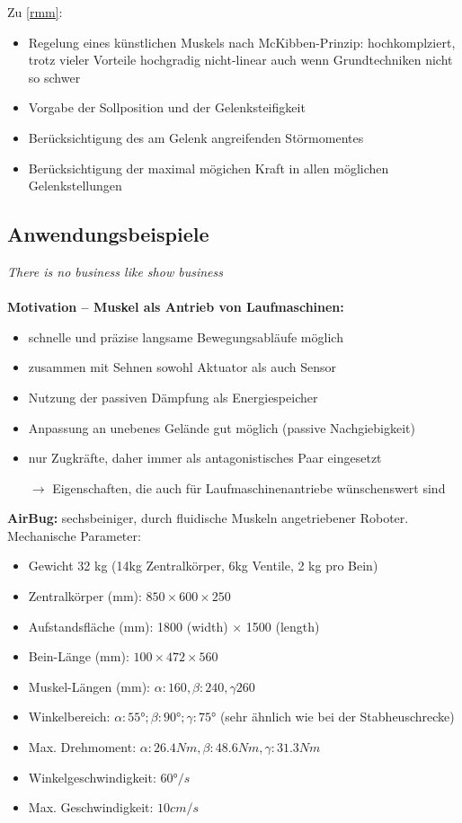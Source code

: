 Zu \autoref{rmm}:
\begin{itemize}
	\item Regelung eines künstlichen Muskels nach McKibben-Prinzip: hochkomplziert, trotz vieler Vorteile hochgradig nicht-linear auch wenn Grundtechniken nicht so schwer
	\item Vorgabe der Sollposition und der Gelenksteifigkeit
	\item Berücksichtigung des am Gelenk angreifenden Störmomentes
	\item Berücksichtigung der maximal mögichen Kraft in allen möglichen Gelenkstellungen
\end{itemize}
\subsection{Anwendungsbeispiele}
\emph{There is no business like show business}\\ \\
\textbf{Motivation – Muskel als Antrieb von Laufmaschinen:}
\begin{itemize}
	\item schnelle und präzise langsame Bewegungsabläufe möglich
	\item zusammen mit Sehnen sowohl Aktuator als auch Sensor
	\item Nutzung der passiven Dämpfung als Energiespeicher
	\item Anpassung an unebenes Gelände gut möglich (passive Nachgiebigkeit)
	\item nur Zugkräfte, daher immer als antagonistisches Paar eingesetzt
	\item[$\rightarrow$] Eigenschaften, die auch für Laufmaschinenantriebe wünschenswert sind
\end{itemize}
\textbf{AirBug:} sechsbeiniger, durch fluidische Muskeln angetriebener Roboter.\\
Mechanische Parameter:
\begin{itemize}
	\setlength\itemsep{0em}
	\item Gewicht 32 kg (14kg Zentralkörper, 6kg Ventile, 2 kg pro Bein)
	\item Zentralkörper (mm): $850 \times 600 \times 250$
	\item Aufstandsfläche (mm): 1800 (width) $\times$ 1500 (length)
	\item Bein-Länge (mm): $100 \times 472 \times 560$
	\item Muskel-Längen (mm): $\alpha: 160, \beta: 240, \gamma 260$
	\item Winkelbereich: $\alpha: 55°; \beta: 90°; \gamma: 75°$ (sehr ähnlich wie bei der Stabheuschrecke)
	\item Max. Drehmoment: $\alpha: 26.4Nm, \beta: 48.6Nm, \gamma: 31.3Nm$
	\item Winkelgeschwindigkeit: $60°/s$
	\item Max. Geschwindigkeit: $10cm/s$
\end{itemize}

